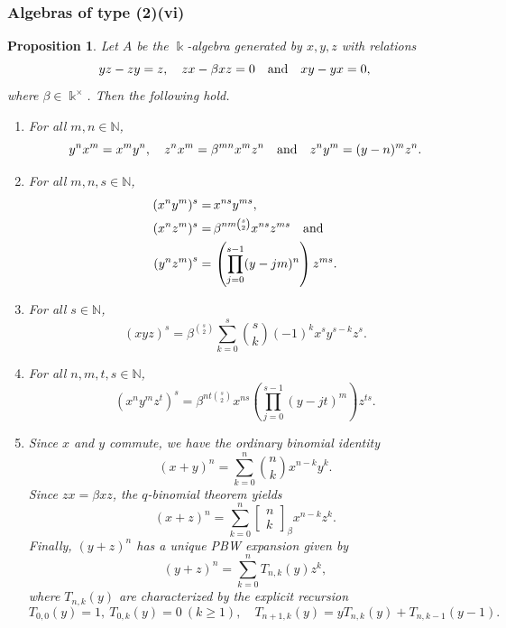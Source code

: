 \documentclass{amsart}
\newtheorem{proposition}[theorem]{Proposition}
\theoremstyle{definition}
\theoremstyle{remark}
\numberwithin{equation}{section}
\begin{document}
\subsubsection{Algebras of type (2)(vi)}

\begin{proposition}\label{case(2)(vi)}
Let $A$ be the $\Bbbk$-algebra generated by $x,y,z$ with relations
\[
yz - zy = z, \quad zx - \beta xz = 0 \quad {\rm and} \quad xy - yx = 0,
\]
where $\beta\in\Bbbk^{\times}$. Then the following hold.
\begin{enumerate}
\item[\rm (1)] For all $m, n\in \mathbb{N}$,
\[
y^n x^m = x^m y^n,\quad z^n x^m = \beta^{mn}x^m z^n \quad {\rm and} \quad z^n y^m = (y-n)^m z^n.
\]

\item[\rm (2)] For all $m, n, s\in \mathbb{N}$,
\begin{align*}
(x^n y^m)^s = &\, x^{ns}y^{ms}, \\    
(x^n z^m)^s = &\, \beta^{nm\binom{s}{2}} x^{ns}z^{ms} \quad {\rm and} \\
\left(y^n z^m\right)^s = &\, \left(\prod_{j=0}^{s-1}(y-jm)^n\right)z^{ms}.
\end{align*}

\item[\rm (3)] For all $s\in \mathbb{N}$,
\begin{equation}\label{xyzpowercase2vi}
(xyz)^s=\beta^{\binom{s}{2}}\sum_{k=0}^{s}\binom{s}{k}(-1)^kx^{s}y^{s-k}z^{s}.
\end{equation}

\item[\rm (4)] For all $n,m,t,s\in \mathbb{N}$,
\begin{equation}\label{blockpowercase2vi}
(x^n y^m z^t)^s = \beta^{nt\binom{s}{2}} 
x^{ns}\left(\prod_{j=0}^{s-1}(y-jt)^m\right)z^{ts}.
\end{equation}

\item[\rm (5)] Since $x$ and $y$ commute, we have the ordinary binomial identity
\[
(x+y)^n=\sum_{k=0}^{n}\binom{n}{k}x^{n-k}y^k.
\]
Since $zx = \beta xz$, the $q$-binomial theorem yields
\[
(x+z)^n=\sum_{k=0}^{n}\begin{bmatrix} n\\ k\end{bmatrix}_{\beta}x^{n-k}z^{k}.
\]
Finally, $(y+z)^n$ has a unique PBW expansion given by
\[
(y+z)^n=\sum_{k=0}^{n}T_{n,k}(y)z^{k},
\]
where $T_{n,k}(y)$ are characterized by the explicit recursion
\[
T_{0,0}(y)=1,\ T_{0,k}(y)=0\ (k\ge 1),\quad T_{n+1,k}(y)=yT_{n,k}(y)+T_{n,k-1}(y-1).
\]
\end{enumerate}
\end{proposition}
\end{document}
